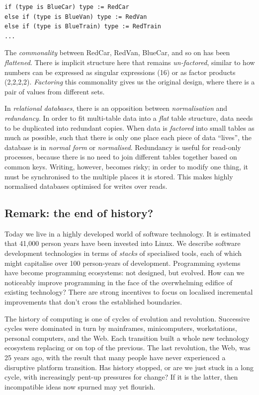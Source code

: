 \documentclass[ twoside,openright,titlepage,numbers=noenddot,headinclude,footinclude,cleardoublepage=empty,abstract=on,
                BCOR=5mm,paper=a4,fontsize=11pt
                ]{scrreprt}
\theoremstyle{definition}
\begin{document}
\begin{verbatim}
if (type is BlueCar) type := RedCar
else if (type is BlueVan) type := RedVan
else if (type is BlueTrain) type := RedTrain
...
\end{verbatim}

The \emph{commonality} between RedCar, RedVan, BlueCar, and so on has
been \emph{flattened}. There is implicit structure here that remains
\emph{un-factored}, similar to how numbers can be expressed as singular
expressions (16) or as factor products (2,2,2,2). \emph{Factoring} this
commonality gives us the original design, where there is a pair of
values from different sets.

In \emph{relational databases}, there is an opposition between
\emph{normalisation} and \emph{redundancy}. In order to fit multi-table
data into a \emph{flat} table structure, data needs to be duplicated
into redundant copies. When data is \emph{factored} into small tables as
much as possible, such that there is only one place each piece of data
``lives'', the database is in \emph{normal form} or \emph{normalised}.
Redundancy is useful for read-only processes, because there is no need
to join different tables together based on common keys. Writing,
however, becomes risky; in order to modify one thing, it must be
synchronised to the multiple places it is stored. This makes highly
normalised databases optimised for writes over reads.

\hypertarget{remark-the-end-of-history}{\subsection{Remark: the end of
history?}\label{remark-the-end-of-history}}

Today we live in a highly developed world of software technology. It is
estimated that 41,000 person years have been invested into Linux. We
describe software development technologies in terms of \emph{stacks} of
specialised tools, each of which might capitalise over 100 person-years
of development. Programming systems have become programming ecosystems:
not designed, but evolved. How can we noticeably improve programming in
the face of the overwhelming edifice of existing technology? There are
strong incentives to focus on localised incremental improvements that
don't cross the established boundaries.

The history of computing is one of cycles of evolution and revolution.
Successive cycles were dominated in turn by mainframes, minicomputers,
workstations, personal computers, and the Web. Each transition built a
whole new technology ecosystem replacing or on top of the previous. The
last revolution, the Web, was 25 years ago, with the result that many
people have never experienced a disruptive platform transition. Has
history stopped, or are we just stuck in a long cycle, with increasingly
pent-up pressures for change? If it is the latter, then incompatible
ideas now spurned may yet flourish.
\end{document}
